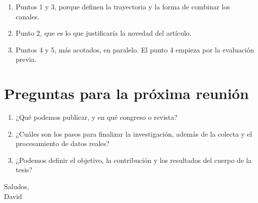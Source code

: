 \documentclass[11pt,a4paper]{article}
\begin{document}
\begin{enumerate}
  \item Puntos 1 y 3, porque definen la trayectoria y la forma de combinar los canales.
  \item Punto 2, que es lo que justificaría la novedad del artículo.
  \item Puntos 4 y 5, más acotados, en paralelo. El punto 4 empieza por la evaluación
  previa.
\end{enumerate}

\section{Preguntas para la próxima reunión}

\begin{enumerate}
  \item ¿Qué podemos publicar, y en qué congreso o revista?
  \item ¿Cuáles son los pasos para finalizar la investigación, además de la colecta y el
  procesamiento de datos reales?
  \item ¿Podemos definir el objetivo, la contribución y los resultados del cuerpo de la
  tesis?
\end{enumerate}

\vspace{0.5cm}
Saludos,\\
David
\end{document}
